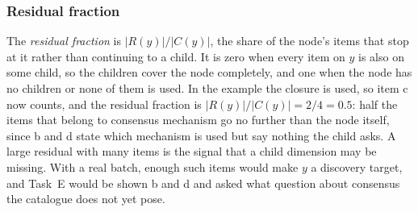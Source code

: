 \subsubsection{Residual fraction}
The \emph{residual fraction} is $|R(y)|/|C(y)|$, the share of the node's
items that stop at it rather than continuing to a child. It is zero when
every item on $y$ is also on some child, so the children cover the node
completely, and one when the node has no children or none of them is used.
In the example the closure is used, so item c now counts, and the residual
fraction is $|R(y)|/|C(y)| = 2/4 = 0.5$: half the items that belong to
consensus mechanism go no further than the node itself, since b and d state
which mechanism is used but say nothing the child asks. A large residual
with many items is the signal that a child dimension may be missing. With a
real batch, enough such items would make $y$ a discovery target, and Task~E
would be shown b and d and asked what question about consensus the catalogue
does not yet pose.

